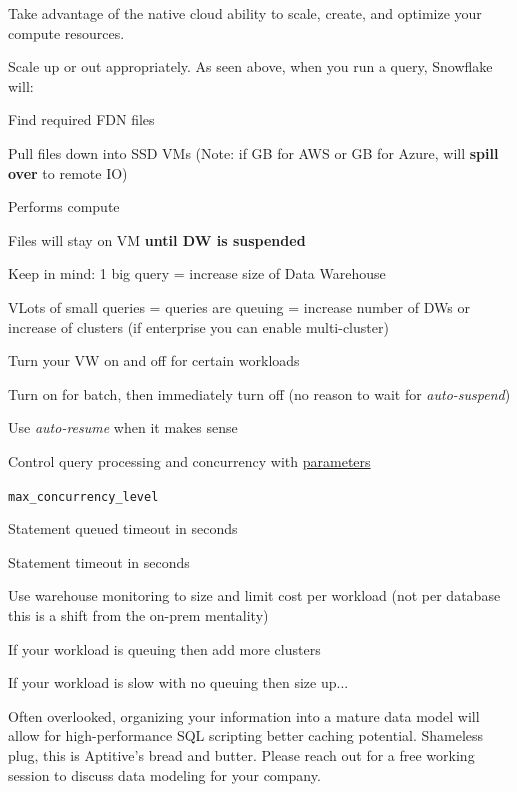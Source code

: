 \documentclass[9pt]{innovativeinnovation-cheatsheet}
\begin{document}
\begin{multicols}{3}

Take advantage of the native cloud ability to scale, create, and optimize your compute resources.

\be{}
      \item Scale up or out appropriately. As seen above, when you run a query, Snowflake will:
      \bi{}
            \item Find required FDN files
            \item Pull files down into SSD VMs (Note: if  GB for AWS or  GB for Azure, will \textbf{spill over} to remote IO)
            \item Performs compute
            \item Files will stay on VM \textbf{until DW is suspended}
            \item Keep in mind: 1 big query = increase size of Data Warehouse
            \item VLots of small queries = queries are queuing = increase number of DWs or increase of clusters (if enterprise you can enable multi-cluster)
      \ei{}
      \item Turn your VW on and off for certain workloads
      \bi{}
            \item Turn on for batch, then immediately turn off (no reason to wait for \textit{auto-suspend})
            \item Use \textit{auto-resume} when it makes sense
      \ei{}
      \item Control query processing and concurrency  with \href{https://docs.snowflake.net/manuals/sql-reference/parameters.html}{parameters}
      \bi{}
            \item \texttt{max\_concurrency\_level}
            \item Statement queued timeout in seconds
            \item Statement timeout in seconds
      \ei{}
      \item Use warehouse monitoring to size and limit cost per workload (not per database  this is a shift from the on-prem mentality)
      \bi{}
            \item If your workload is queuing then add more clusters
            \item If your workload is slow with no queuing then size up...
      \ei{}

\ee{}


Often overlooked, organizing your information into a mature data model will allow for high-performance SQL scripting better caching potential. Shameless plug, this is Aptitive's bread and butter. Please reach out for a free working session to discuss data modeling for your company.


\end{multicols}
\end{document}
